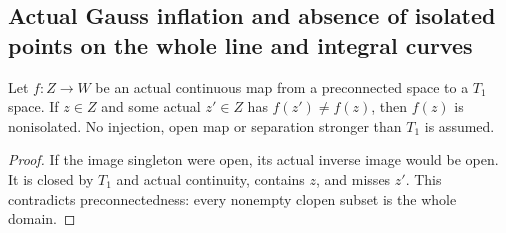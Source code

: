 \subsection{Actual Gauss inflation and absence of isolated points on the whole line and integral curves}
\label{subsec:gauss-inflation-curve-nonisolation}

\begin{lemma}
\label{topology:actual-connected-path-nonisolation}
\leanok
{}
Let $f:Z\to W$ be an actual continuous map from a preconnected
space to a $T_1$ space. If $z\in Z$ and some actual $z'\in Z$
has $f(z')\ne f(z)$, then $f(z)$ is nonisolated. No injection,
open map or separation stronger than $T_1$ is assumed.
\end{lemma}
\begin{proof}
If the image singleton were open, its actual inverse image would
be open. It is closed by $T_1$ and actual continuity, contains $z$,
and misses $z'$. This contradicts preconnectedness: every nonempty
clopen subset is the whole domain.
\end{proof}

